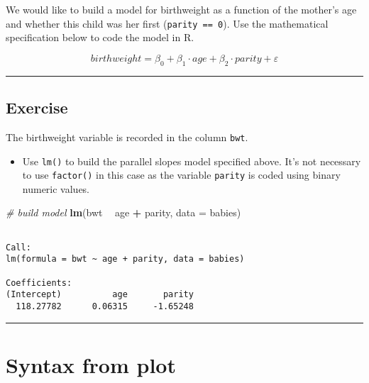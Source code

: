 \documentclass[]{book}
\newenvironment{Shaded}{\begin{snugshade}}{\end{snugshade}}
\newcommand{\KeywordTok}[1]{\textcolor[rgb]{0.13,0.29,0.53}{\textbf{#1}}}
\newcommand{\DataTypeTok}[1]{\textcolor[rgb]{0.13,0.29,0.53}{#1}}
\newcommand{\StringTok}[1]{\textcolor[rgb]{0.31,0.60,0.02}{#1}}
\newcommand{\CommentTok}[1]{\textcolor[rgb]{0.56,0.35,0.01}{\textit{#1}}}
\newcommand{\OperatorTok}[1]{\textcolor[rgb]{0.81,0.36,0.00}{\textbf{#1}}}
\newcommand{\NormalTok}[1]{#1}
\providecommand{\tightlist}{%
  \setlength{\itemsep}{0pt}\setlength{\parskip}{0pt}}
\begin{document}
We would like to build a model for birthweight as a function of the
mother's age and whether this child was her first
(\texttt{parity\ ==\ 0}). Use the mathematical specification below to
code the model in R.

\[birthweight=\beta_0 + \beta_1 \cdot age + \beta_2 \cdot parity + \varepsilon\]

\begin{center}\rule{0.5\linewidth}{\linethickness}\end{center}

\subsection*{Exercise}\label{exercise-2}

The birthweight variable is recorded in the column \texttt{bwt}.

\begin{itemize}
\tightlist
\item
  Use \texttt{lm()} to build the parallel slopes model specified above.
  It's not necessary to use \texttt{factor()} in this case as the
  variable \texttt{parity} is coded using binary numeric values.
\end{itemize}

\begin{Shaded}
\begin{Highlighting}[]
\CommentTok{# build model}
\KeywordTok{lm}\NormalTok{(bwt }\OperatorTok{~}\StringTok{ }\NormalTok{age }\OperatorTok{+}\StringTok{ }\NormalTok{parity, }\DataTypeTok{data =}\NormalTok{ babies)}
\end{Highlighting}
\end{Shaded}

\begin{verbatim}

Call:
lm(formula = bwt ~ age + parity, data = babies)

Coefficients:
(Intercept)          age       parity  
  118.27782      0.06315     -1.65248  
\end{verbatim}

\begin{center}\rule{0.5\linewidth}{\linethickness}\end{center}

\section{Syntax from plot}\label{syntax-from-plot}
\end{document}
